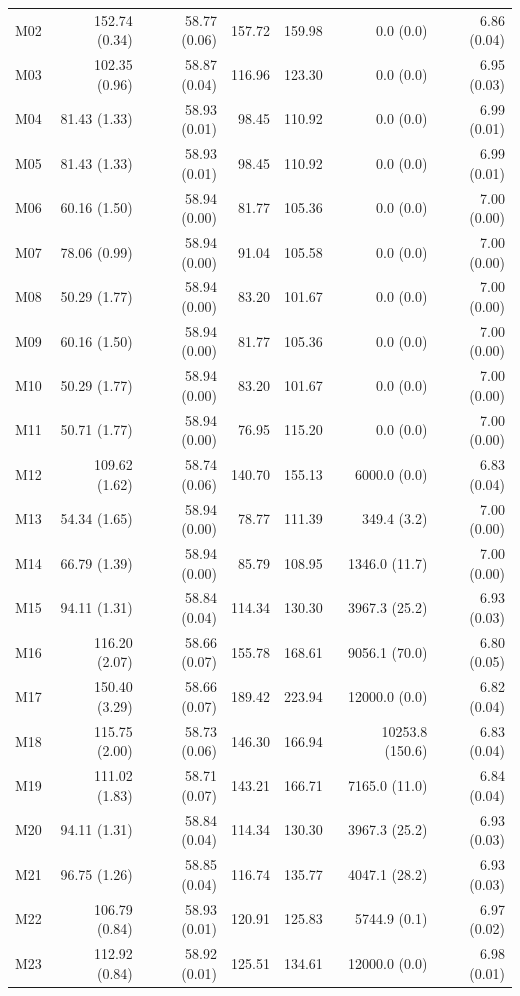 \documentclass[11pt]{article}
\theoremstyle{remark}
\begin{document}
\begin{longtable}{lrrrrrr}
M02 & 152.74 (0.34) & 58.77 (0.06) & 157.72 & 159.98 & 0.0 (0.0) & 6.86 (0.04) \\
M03 & 102.35 (0.96) & 58.87 (0.04) & 116.96 & 123.30 & 0.0 (0.0) & 6.95 (0.03) \\
M04 & 81.43 (1.33) & 58.93 (0.01) & 98.45 & 110.92 & 0.0 (0.0) & 6.99 (0.01) \\
M05 & 81.43 (1.33) & 58.93 (0.01) & 98.45 & 110.92 & 0.0 (0.0) & 6.99 (0.01) \\
M06 & 60.16 (1.50) & 58.94 (0.00) & 81.77 & 105.36 & 0.0 (0.0) & 7.00 (0.00) \\
M07 & 78.06 (0.99) & 58.94 (0.00) & 91.04 & 105.58 & 0.0 (0.0) & 7.00 (0.00) \\
M08 & 50.29 (1.77) & 58.94 (0.00) & 83.20 & 101.67 & 0.0 (0.0) & 7.00 (0.00) \\
M09 & 60.16 (1.50) & 58.94 (0.00) & 81.77 & 105.36 & 0.0 (0.0) & 7.00 (0.00) \\
M10 & 50.29 (1.77) & 58.94 (0.00) & 83.20 & 101.67 & 0.0 (0.0) & 7.00 (0.00) \\
M11 & 50.71 (1.77) & 58.94 (0.00) & 76.95 & 115.20 & 0.0 (0.0) & 7.00 (0.00) \\
M12 & 109.62 (1.62) & 58.74 (0.06) & 140.70 & 155.13 & 6000.0 (0.0) & 6.83 (0.04) \\
M13 & 54.34 (1.65) & 58.94 (0.00) & 78.77 & 111.39 & 349.4 (3.2) & 7.00 (0.00) \\
M14 & 66.79 (1.39) & 58.94 (0.00) & 85.79 & 108.95 & 1346.0 (11.7) & 7.00 (0.00) \\
M15 & 94.11 (1.31) & 58.84 (0.04) & 114.34 & 130.30 & 3967.3 (25.2) & 6.93 (0.03) \\
M16 & 116.20 (2.07) & 58.66 (0.07) & 155.78 & 168.61 & 9056.1 (70.0) & 6.80 (0.05) \\
M17 & 150.40 (3.29) & 58.66 (0.07) & 189.42 & 223.94 & 12000.0 (0.0) & 6.82 (0.04) \\
M18 & 115.75 (2.00) & 58.73 (0.06) & 146.30 & 166.94 & 10253.8 (150.6) & 6.83 (0.04) \\
M19 & 111.02 (1.83) & 58.71 (0.07) & 143.21 & 166.71 & 7165.0 (11.0) & 6.84 (0.04) \\
M20 & 94.11 (1.31) & 58.84 (0.04) & 114.34 & 130.30 & 3967.3 (25.2) & 6.93 (0.03) \\
M21 & 96.75 (1.26) & 58.85 (0.04) & 116.74 & 135.77 & 4047.1 (28.2) & 6.93 (0.03) \\
M22 & 106.79 (0.84) & 58.93 (0.01) & 120.91 & 125.83 & 5744.9 (0.1) & 6.97 (0.02) \\
M23 & 112.92 (0.84) & 58.92 (0.01) & 125.51 & 134.61 & 12000.0 (0.0) & 6.98 (0.01) \\

\end{longtable}
\end{document}
